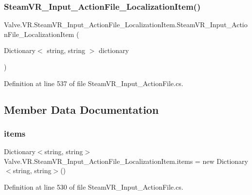 \subsubsection{\texorpdfstring{SteamVR\_Input\_ActionFile\_LocalizationItem()}{SteamVR\_Input\_ActionFile\_LocalizationItem()}\hspace{0.1cm}{\footnotesize\ttfamily [2/2]}}
{\footnotesize\ttfamily Valve.\+V\+R.\+Steam\+V\+R\+\_\+\+Input\+\_\+\+Action\+File\+\_\+\+Localization\+Item.\+Steam\+V\+R\+\_\+\+Input\+\_\+\+Action\+File\+\_\+\+Localization\+Item (\begin{DoxyParamCaption}\item[{Dictionary$<$ string, string $>$}]{dictionary }\end{DoxyParamCaption})}



Definition at line 537 of file Steam\+V\+R\+\_\+\+Input\+\_\+\+Action\+File.\+cs.



\subsection{Member Data Documentation}
\mbox{\label{class_valve_1_1_v_r_1_1_steam_v_r___input___action_file___localization_item_a1c0d2c5d790ae03c3a734b23ff38de72}} 
\subsubsection{\texorpdfstring{items}{items}}
{\footnotesize\ttfamily Dictionary$<$string, string$>$ Valve.\+V\+R.\+Steam\+V\+R\+\_\+\+Input\+\_\+\+Action\+File\+\_\+\+Localization\+Item.\+items = new Dictionary$<$string, string$>$()}



Definition at line 530 of file Steam\+V\+R\+\_\+\+Input\+\_\+\+Action\+File.\+cs.

\mbox{\label{class_valve_1_1_v_r_1_1_steam_v_r___input___action_file___localization_item_a9cd20dc1ee348ef57fafa99d0d7e87b3}} 
